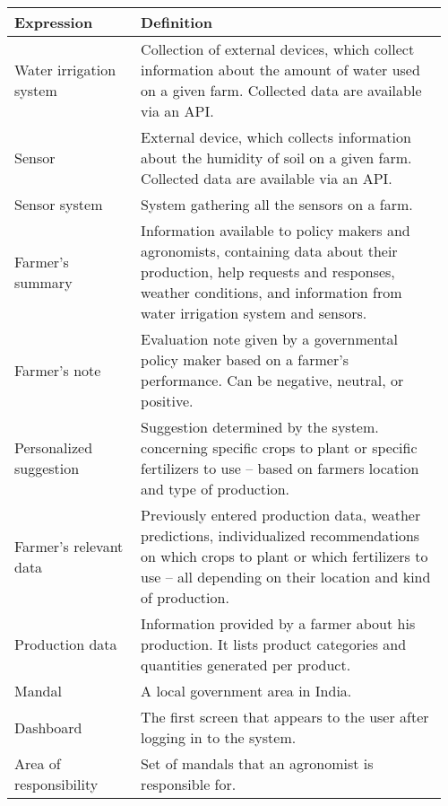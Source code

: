 \begin{center}
\begin{longtable}{@{}p{0.28\linewidth} p{0.68\linewidth}@{}}
		\toprule
		\textbf{Expression}     & \textbf{Definition}\\
		\midrule
		Water irrigation system & Collection of external devices, which collect information about the amount of water used on a given farm. Collected data are available via an API. \\
        Sensor                  & External device, which collects information about the humidity of soil on a given farm. Collected data are available via an API.\\
        Sensor system           & System gathering all the sensors on a farm.\\
        Farmer's summary        & Information available to policy makers and agronomists, containing data about their production, help requests and responses, weather conditions, and information from water irrigation system and sensors.\\
        Farmer's note           & Evaluation note given by a governmental policy maker based on a farmer's performance. Can be negative, neutral, or positive.\\
        Personalized suggestion & Suggestion determined by the system. concerning specific crops to plant or specific fertilizers to use – based on farmers location and type of production.\\
        Farmer's relevant data  & Previously entered production data, weather predictions, individualized recommendations on which crops to plant or which fertilizers to use – all depending on their location and kind of production.\\
        Production data         & Information provided by a farmer about his production. It lists product categories and quantities generated per product.\\
        Mandal                  & A local government area in India.\\
        Dashboard               & The first screen that appears to the user after logging in to the system.\\
        Area of responsibility  & Set of mandals that an agronomist is responsible for.\\

\end{longtable}
\end{center}

